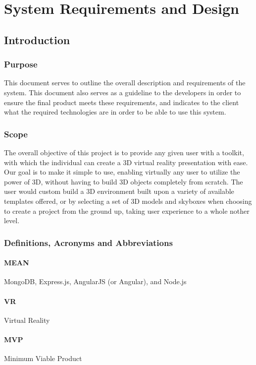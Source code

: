 
\section{System Requirements and Design}

\subsection{Introduction}

	\subsubsection{Purpose}
	This document serves to outline the overall description and requirements of 	the system. This document also serves as a guideline to the developers in 		order to ensure the final product meets these requirements, and indicates 		to the client what the required technologies are in order to be able to use 	this system.

	\subsubsection{Scope}

	The overall objective of this project is to provide any given user with a toolkit, with which the individual can create a 3D virtual reality presentation with ease. Our goal is to make it simple to use, enabling virtually any user to utilize the power of 3D, without having to build 3D objects completely from scratch. The user would custom build a 3D environment built upon a variety of available templates offered, or by selecting a set of 3D models and skyboxes when choosing to create a project from the ground up, taking user experience to a whole nother level.

	\subsubsection{Definitions, Acronyms and Abbreviations}
			\paragraph{MEAN}	MongoDB, Express.js, AngularJS (or Angular), and Node.js
			\paragraph{VR}	Virtual Reality
			\paragraph{MVP} Minimum Viable Product
